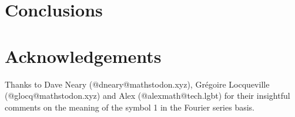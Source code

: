 \documentclass{article}
\theoremstyle{definition}
\begin{document}
%
%	
%
%
% 
% 
%
%
%
\section{Conclusions}
\label{sec:conclusions}
%
%
%
\section*{Acknowledgements}
\label{sec:acknowledgements}
Thanks to Dave Neary (@dneary@mathstodon.xyz), Grégoire 
Locqueville (@glocq@mathstodon.xyz) and Alex (@alexmath@tech.lgbt) 
for their insightful comments on the meaning of the symbol 1 in 
the Fourier series basis.
%
%
\end{document}
